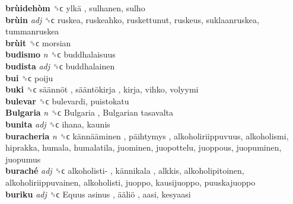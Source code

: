 \textbf{brùidehòm} ␝ϲ   ylkä , sulhanen, sulho  \\
\textbf{brùin} \emph{adj}  ␝ϲ  ruskea, ruskeahko, ruskettunut, ruskeus, suklaanruskea, tummanruskea  \\
\textbf{brùit} ␝ϲ  morsian  \\
\textbf{budismo} \emph{n}  ␝ϲ  buddhalaisuus  \\
\textbf{budista} \emph{adj}  ␝ϲ  buddhalainen  \\
\textbf{bui} ␝ϲ  poiju  \\
\textbf{buki} ␝ϲ   säännöt ,  sääntökirja , kirja, vihko, volyymi  \\
\textbf{bulevar} ␝ϲ  bulevardi, puistokatu  \\
\textbf{Bulgaria} \emph{n}  ␝ϲ   Bulgaria ,  Bulgarian tasavalta   \\
\textbf{bunita} \emph{adj}  ␝ϲ  ihana, kaunis  \\
\textbf{buracheria} \emph{n}  ␝ϲ   kännääminen ,  päihtymys , alkoholiriippuvuus, alkoholismi, hiprakka, humala, humalatila, juominen, juopottelu, juoppous, juopuminen, juopumus  \\
\textbf{buraché} \emph{adj}  ␝ϲ   alkoholisti- ,  kännikala , alkkis, alkoholipitoinen, alkoholiriippuvainen, alkoholisti, juoppo, kausijuoppo, puuskajuoppo  \\
\textbf{buriku} \emph{adj}  ␝ϲ   Equus asinus ,  ääliö , aasi, kesyaasi  \\
